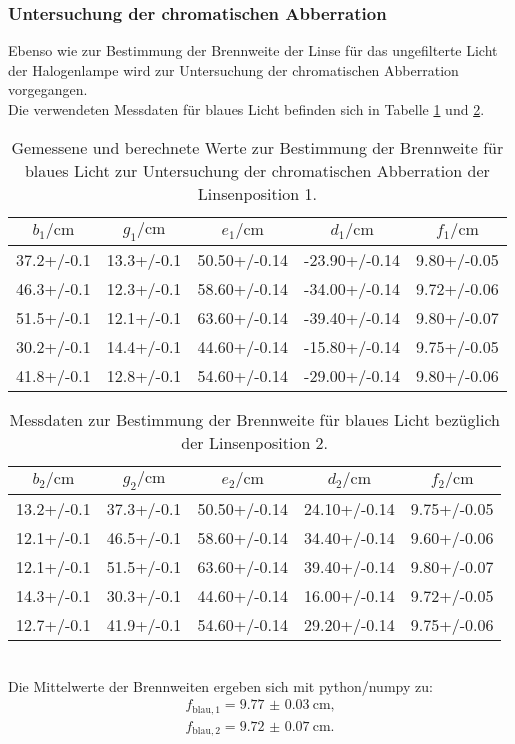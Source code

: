 \subsubsection{Untersuchung der chromatischen Abberration}
Ebenso wie zur Bestimmung der Brennweite der Linse für das ungefilterte Licht der Halogenlampe wird zur Untersuchung der chromatischen Abberration vorgegangen.
\\Die verwendeten Messdaten für blaues Licht befinden sich in Tabelle \ref{tab:blaueins} und \ref{tab:blauzwo}.
\begin{table}
  \caption{Gemessene und berechnete Werte zur Bestimmung der Brennweite für blaues Licht zur Untersuchung der chromatischen Abberration der Linsenposition 1.}
  \label{tab:blaueins}
  \centering
\begin{tabular}{ccccc}
  \toprule
$b_\mathrm{1}/\si{\centi\meter}$ & $g_\mathrm{1}/\si{\centi\meter}$ & $e_\mathrm{1}/\si{\centi\meter}$ & $d_\mathrm{1}/\si{\centi\meter}$ & $f_\mathrm{1}/\si{\centi\meter}$ \\
\midrule
37.2+/-0.1 & 13.3+/-0.1 & 50.50+/-0.14 & -23.90+/-0.14 & 9.80+/-0.05 \\
46.3+/-0.1 & 12.3+/-0.1 & 58.60+/-0.14 & -34.00+/-0.14 & 9.72+/-0.06 \\
51.5+/-0.1 & 12.1+/-0.1 & 63.60+/-0.14 & -39.40+/-0.14 & 9.80+/-0.07 \\
30.2+/-0.1 & 14.4+/-0.1 & 44.60+/-0.14 & -15.80+/-0.14 & 9.75+/-0.05 \\
41.8+/-0.1 & 12.8+/-0.1 & 54.60+/-0.14 & -29.00+/-0.14 & 9.80+/-0.06 \\
\bottomrule
\end{tabular}
\end{table}
\begin{table}
\caption{Messdaten zur Bestimmung der Brennweite für blaues Licht bezüglich der Linsenposition 2.}
  \label{tab:blauzwo}
  \centering
\begin{tabular}{ccccc}
  \toprule
$b_\mathrm{2}/\si{\centi\meter}$ & $g_\mathrm{2}/\si{\centi\meter}$ & $e_\mathrm{2}/\si{\centi\meter}$ & $d_\mathrm{2}/\si{\centi\meter}$ & $f_\mathrm{2}/\si{\centi\meter}$ \\
\midrule
13.2+/-0.1 & 37.3+/-0.1 & 50.50+/-0.14 & 24.10+/-0.14 & 9.75+/-0.05 \\
12.1+/-0.1 & 46.5+/-0.1 & 58.60+/-0.14 & 34.40+/-0.14 & 9.60+/-0.06 \\
12.1+/-0.1 & 51.5+/-0.1 & 63.60+/-0.14 & 39.40+/-0.14 & 9.80+/-0.07 \\
14.3+/-0.1 & 30.3+/-0.1 & 44.60+/-0.14 & 16.00+/-0.14 & 9.72+/-0.05 \\
12.7+/-0.1 & 41.9+/-0.1 & 54.60+/-0.14 & 29.20+/-0.14 & 9.75+/-0.06 \\
\bottomrule
\end{tabular}
\end{table}
\\Die Mittelwerte der Brennweiten ergeben sich mit python/numpy zu:
\begin{gather*}
  f_\mathrm{blau, 1}= \SI{9.77(3)}{\centi\meter} \text{,}\\
  f_\mathrm{blau, 2}= \SI{9.72(7)}{\centi\meter}\text{.}
\end{gather*}


